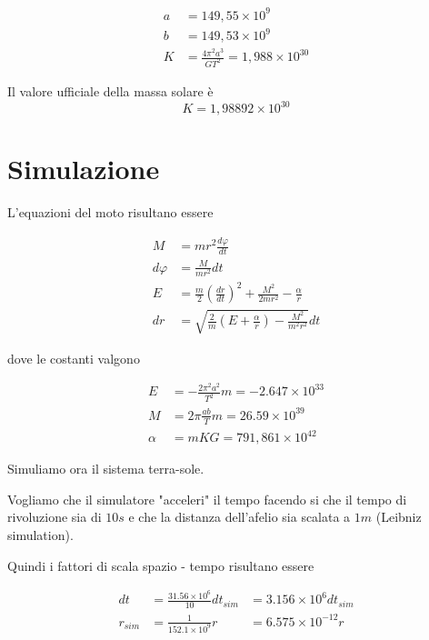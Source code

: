 \documentclass[a4paper,11pt]{article}
\begin{document}
\begin{align*}
	a & = 149,55 \times 10^9 \\
	b & = 149,53 \times 10^9 \\
	K & = \frac{4 \pi^2 a^3}{GT^2} = 1,988 \times 10^{30}
\end{align*}

Il valore ufficiale della massa solare è
\[
	K = 1,98892 \times 10^{30}
\]

\section{Simulazione}

L'equazioni del moto risultano essere

\begin{align*}
    M & = m r^2 \frac{d \varphi}{dt}  \\
    d \varphi & = \frac{M}{m r^2} dt \\
	E & = \frac{m}{2} \left( \frac{dr}{dt} \right) ^2 + \frac{M^2}{2 m r^2} - \frac{\alpha}{r}\\
	dr & = \sqrt{\frac{2}{m} \left( E + \frac{\alpha}{r} \right) - \frac{M^2}{m^2 r^2} } dt
\end{align*}

dove le costanti valgono

\begin{align*}
	E & = - \frac{2 \pi^2 a^2}{T^2} m = -2.647 \times 10^{33} \\
	M & = 2 \pi \frac{ab}{T} m = 26.59 \times 10^{39} \\
	\alpha & = mKG = 791,861 \times 10^{42}
\end{align*}

Simuliamo ora il sistema terra-sole.

Vogliamo che il simulatore "acceleri" il tempo facendo si che il tempo di rivoluzione sia di $ 10 s $
e che la distanza dell'afelio sia scalata a $1 m$ (Leibniz simulation).

Quindi i fattori di scala spazio - tempo risultano essere

\begin{align*}
	dt & = \frac{31.56 \times 10^6}{10} dt_{sim} & = 3.156 \times 10^6 dt_{sim} \\
	r_{sim} & = \frac{1}{152.1 \times 10^9} r & = 6.575 \times 10^{-12} r
\end{align*}
\end{document}
